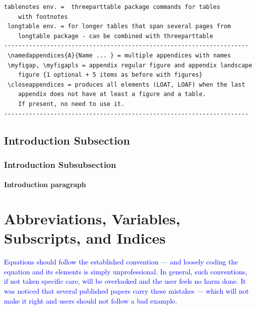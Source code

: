 \documentclass[phd]{ndsu-thesis-2022}
\newcommand\italk[1]{\textcolor{blue}{#1}}  %
\begin{document}
\begin{lstlisting}[basicstyle=\ttfamily\footnotesize\color{blue}]
 tablenotes env. =  threeparttable package commands for tables 
 	with footnotes 
 longtable env. = for longer tables that span several pages from 
 	longtable package - can be combined with threeparttable 
---------------------------------------------------------------------
 \namedappendices{A}{Name ... } = multiple appendices with names 
 \myfigap, \myfigapls = appendix regular figure and appendix landscape 
 	figure {1 optional + 5 items as before with figures}
 \closeappendices = produces all elements (LOAT, LOAF) when the last 
 	appendix does not have at least a figure and a table. 
	If present, no need to use it.
---------------------------------------------------------------------
\end{lstlisting}

\subsection{Introduction Subsection}
\kant[4]

\subsubsection{Introduction Subsubsection}
\kant[6]

\paragraph{Introduction paragraph}
\kant[8]


\section{Abbreviations, Variables, Subscripts, and Indices}
\italk{Equations should follow the established convention --- and loosely coding the equation and its elements is simply unprofessional. In general, such conventions, if not taken specific care, will be overlooked and the user feels no harm done. It was noticed that several published papers carry these mistakes --- which will not make it right and users should not follow a bad example.}
\end{document}
